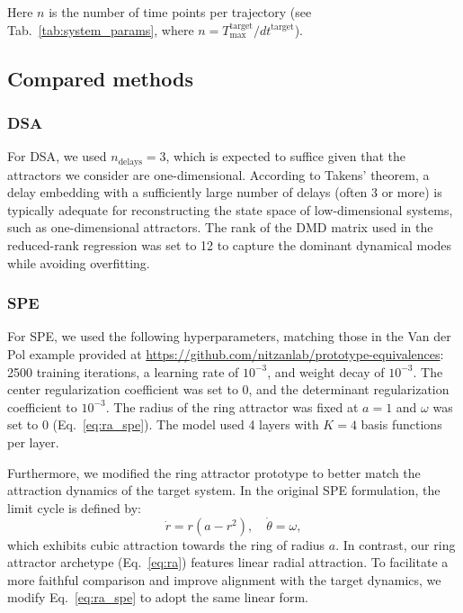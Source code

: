\documentclass{article}
\theoremstyle{definition} \newtheorem{definition}{Definition}  \newtheorem{example}{Example}
\theoremstyle{remark} \newtheorem{remark}{Remark}
\newcounter{ct}
\begin{document}
Here $n$ is the number of time points per trajectory (see Tab.~\ref{tab:system_params}, where $n= T_{\text{max}}^{\text{target}}/dt^{\text{target}}$). 

\subsection{Compared methods}

 \subsubsection{DSA}
For DSA\citep{ostrow2024beyond}, we used $n_{\text{delays}}=3$, which is expected to suffice given that the attractors we consider are one-dimensional.
According to Takens' theorem, a delay embedding with a sufficiently large number of delays (often 3 or more) is typically adequate for reconstructing the state space of low-dimensional systems, such as one-dimensional attractors.
The rank of the DMD matrix used in the reduced-rank regression was set to 12 to capture the dominant dynamical modes while avoiding overfitting.

 \subsubsection{SPE}
 For SPE\citep{friedman2025characterizing}, we used the following hyperparameters, matching those in the Van der Pol example provided at \url{https://github.com/nitzanlab/prototype-equivalences}:
  2500 training iterations, a learning rate of \( 10^{-3} \), and weight decay of \( 10^{-3} \).
 The center regularization coefficient was set to 0, and the determinant regularization coefficient to \( 10^{-3} \). 
 The radius of the ring attractor was fixed at \( a = 1 \) and $\omega$ was set to $0$ (Eq.~\ref{eq:ra_spe}).
 The model used 4 layers with \( K = 4 \) basis functions per layer.
 
Furthermore, we modified the ring attractor prototype to better match the attraction dynamics of the target system. 
In the original SPE formulation, the limit cycle is defined by:
\begin{equation}\label{eq:ra_spe}
\dot{r} = r(a - r^2), \quad \dot{\theta} = \omega,
\end{equation}
which exhibits cubic attraction towards the ring of radius \( a \).
In contrast, our ring attractor archetype (Eq.~\ref{eq:ra}) features linear radial attraction.
To facilitate a more faithful comparison and improve alignment with the target dynamics, we modify Eq.~\ref{eq:ra_spe} to adopt the same linear form.
\end{document}
